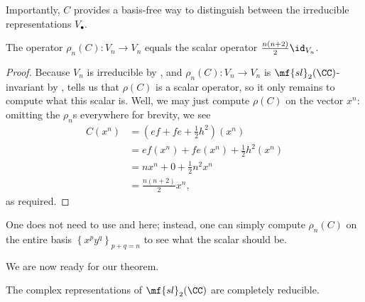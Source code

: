 \documentclass[../notes.tex]{subfiles}
\begin{document}
Importantly, $C$ provides a basis-free way to distinguish between the irreducible representations $V_\bullet$.
\begin{lemma} \label{lem:sl2-casimir-irrep-scalar}
	The operator $\rho_n(C)\colon V_n\to V_n$ equals the scalar operator $\frac{n(n+2)}2\id_{V_n}$.
\end{lemma}
\begin{proof}
	Because $V_n$ is irreducible by , and $\rho_n(C)\colon V_n\to V_n$ is $\mf{sl}_2(\CC)$-invariant by ,  tells us that $\rho(C)$ is a scalar operator, so it only remains to compute what this scalar is. Well, we may just compute $\rho(C)$ on the vector $x^n$: omitting the $\rho_n$s everywhere for brevity, we see
	\begin{align*}
		C\left(x^n\right) &= \left(ef+fe+\frac12h^2\right)\left(x^n\right) \\
		&= ef\left(x^n\right)+fe\left(x^n\right)+\frac12h^2\left(x^n\right) \\
		&= nx^n+0+\frac12n^2x^n \\
		&= \frac{n(n+2)}2x^n,
	\end{align*}
	as required.
\end{proof}
\begin{remark}
	One does not need to use  and  here; instead, one can simply compute $\rho_n(C)$ on the entire basis $\left\{x^py^q\right\}_{p+q=n}$ to see what the scalar should be.
\end{remark}
We are now ready for our theorem.
\begin{theorem} \label{thm:sl2-reduces}
	The complex representations of $\mf{sl}_2(\CC)$ are completely reducible.
\end{theorem}
\end{document}
